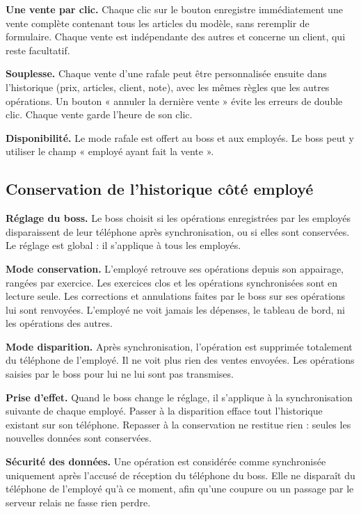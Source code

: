 \documentclass[11pt,a4paper]{article}
\newcommand{\fonc}[2]{\textbf{#1.} #2\par\vspace{0.2em}}
\begin{document}
	\fonc{Une vente par clic}{Chaque clic sur le bouton enregistre immédiatement une vente complète contenant tous les articles du modèle, sans reremplir de formulaire. Chaque vente est indépendante des autres et concerne un client, qui reste facultatif.}
	
	\fonc{Souplesse}{Chaque vente d'une rafale peut être personnalisée ensuite dans l'historique (prix, articles, client, note), avec les mêmes règles que les autres opérations. Un bouton « annuler la dernière vente » évite les erreurs de double clic. Chaque vente garde l'heure de son clic.}
	
	\fonc{Disponibilité}{Le mode rafale est offert au boss et aux employés. Le boss peut y utiliser le champ « employé ayant fait la vente ».}
	
	\subsection{Conservation de l'historique côté employé}
	
	\fonc{Réglage du boss}{Le boss choisit si les opérations enregistrées par les employés disparaissent de leur téléphone après synchronisation, ou si elles sont conservées. Le réglage est global : il s'applique à tous les employés.}
	
	\fonc{Mode conservation}{L'employé retrouve ses opérations depuis son appairage, rangées par exercice. Les exercices clos et les opérations synchronisées sont en lecture seule. Les corrections et annulations faites par le boss sur ses opérations lui sont renvoyées. L'employé ne voit jamais les dépenses, le tableau de bord, ni les opérations des autres.}
	
	\fonc{Mode disparition}{Après synchronisation, l'opération est supprimée totalement du téléphone de l'employé. Il ne voit plus rien des ventes envoyées. Les opérations saisies par le boss pour lui ne lui sont pas transmises.}
	
	\fonc{Prise d'effet}{Quand le boss change le réglage, il s'applique à la synchronisation suivante de chaque employé. Passer à la disparition efface tout l'historique existant sur son téléphone. Repasser à la conservation ne restitue rien : seules les nouvelles données sont conservées.}
	
	\fonc{Sécurité des données}{Une opération est considérée comme synchronisée uniquement après l'accusé de réception du téléphone du boss. Elle ne disparaît du téléphone de l'employé qu'à ce moment, afin qu'une coupure ou un passage par le serveur relais ne fasse rien perdre.}
	
\end{document}
